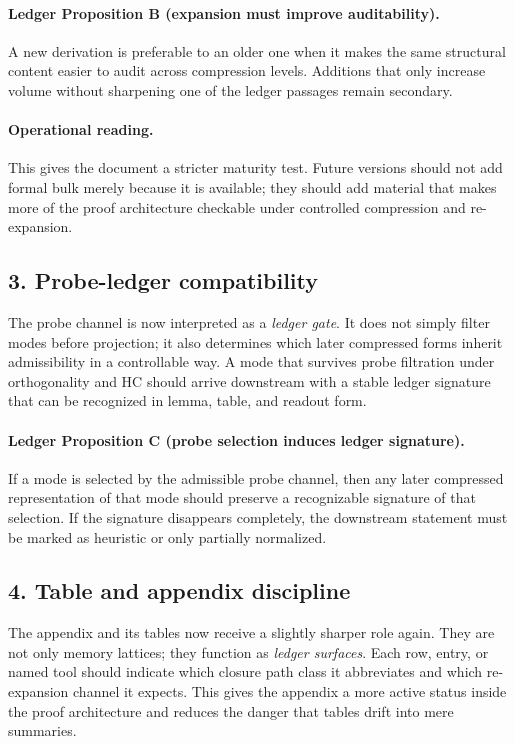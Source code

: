 \paragraph{Ledger Proposition B (expansion must improve auditability).}
A new derivation is preferable to an older one when it makes the same structural
content easier to audit across compression levels. Additions that only increase
volume without sharpening one of the ledger passages remain secondary.

\paragraph{Operational reading.}
This gives the document a stricter maturity test. Future versions should not add
formal bulk merely because it is available; they should add material that makes
more of the proof architecture checkable under controlled compression and
re-expansion.

\subsection*{3. Probe-ledger compatibility}
The probe channel is now interpreted as a \emph{ledger gate}. It does not simply
filter modes before projection; it also determines which later compressed forms
inherit admissibility in a controllable way. A mode that survives probe
filtration under orthogonality and HC should arrive downstream with a stable
ledger signature that can be recognized in lemma, table, and readout form.

\paragraph{Ledger Proposition C (probe selection induces ledger signature).}
If a mode is selected by the admissible probe channel, then any later compressed
representation of that mode should preserve a recognizable signature of that
selection. If the signature disappears completely, the downstream statement must
be marked as heuristic or only partially normalized.

\subsection*{4. Table and appendix discipline}
The appendix and its tables now receive a slightly sharper role again. They are
not only memory lattices; they function as \emph{ledger surfaces}. Each row,
entry, or named tool should indicate which closure path class it abbreviates and
which re-expansion channel it expects. This gives the appendix a more active
status inside the proof architecture and reduces the danger that tables drift
into mere summaries.


